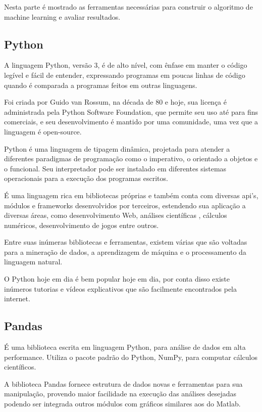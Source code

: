 \documentclass[tcc, capa]{texucpel}
\begin{document}
Nesta parte é mostrado as ferramentas necessárias para construir o algoritmo de machine learning e avaliar resultados.

\subsection{Python}

A linguagem Python, versão 3, é de alto nível, com ênfase em manter o código legível e fácil de entender,  expressando programas em poucas linhas de código quando é comparada a programas feitos em outras linguagens.

Foi criada por Guido van Rossum, na década de 80 e hoje, sua licença é administrada pela Python Software Foundation,\cite{pythonfundation} que permite seu uso até para fins comerciais, e seu desenvolvimento é mantido por uma comunidade, uma vez que a linguagem é open-source.

Python é uma linguagem de tipagem dinâmica, projetada para atender a diferentes paradigmas de programação como o imperativo, o orientado a objetos e o funcional. 
Seu interpretador pode ser instalado em diferentes sistemas operacionais para a execução dos programas escritos.

É uma linguagem rica em bibliotecas próprias e também conta com diversas api's, módulos e frameworks desenvolvidos por terceiros, estendendo sua aplicação a diversas áreas, como desenvolvimento Web, análises científicas , cálculos numéricos, desenvolvimento de jogos entre outros.

Entre suas inúmeras bibliotecas e ferramentas, existem várias que são voltadas para a mineração de dados, a aprendizagem de máquina e o processamento da linguagem natural.

O Python hoje em dia é bem popular hoje em dia, por conta disso existe inúmeros tutorias e vídeos explicativos que são facilmente encontrados pela internet.

\subsection{Pandas}
É uma biblioteca escrita em linguagem Python, para análise de dados em alta performance. Utiliza o pacote padrão do Python, NumPy, para computar cálculos científicos.

A biblioteca Pandas fornece estrutura de dados novas e ferramentas para sua manipulação, provendo maior facilidade na execução das análises desejadas podendo ser integrada outros módulos com gráficos similares aos do Matlab.
\end{document}

